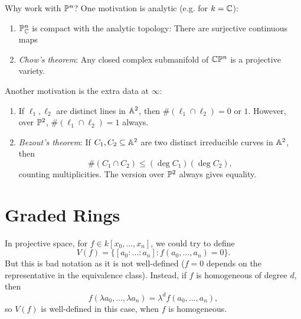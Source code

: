 \begin{remark}
  Why work with $\mathbb{P}^n$? One motivation
  is analytic (e.g. for $k = \mathbb{C}$):
  \begin{enumerate}
    \item $\mathbb{P}^n_{\mathbb{C}}$ is compact
      with the analytic topology:
      There are surjective continuous maps
      \begin{center}
      \end{center}
    \item \emph{Chow's theorem}:
      Any closed complex submanifold
      of $\mathbb{C} \mathbb{P}^n$ is a projective
      variety.
  \end{enumerate}
  Another motivation is the extra data
  at $\infty$:
  \begin{enumerate}
    \item If $\ell_1, \ell_2$ are
      distinct lines in $\mathbb{A}^2$, then
      $\#(\ell_1 \cap \ell_2) = 0$ or $1$.
      However, over $\mathbb{P}^2$,
      $\#(\ell_1 \cap \ell_2) = 1$ always.
    \item \emph{Bezout's theorem}: If
      $C_1, C_2 \subseteq \mathbb{A}^2$ are
      two distinct irreducible curves in
      $\mathbb{A}^2$, then
      \[
        \#(C_1 \cap C_2)
        \le (\deg C_1)(\deg C_2),
      \]
      counting multiplicities. The
      version over $\mathbb{P}^2$ always gives
      equality.
  \end{enumerate}
\end{remark}

\section{Graded Rings}

\begin{remark}
  In projective space,
  for $f \in k[x_0, \dots, x_n]$,
  we could try to define
  \[
    V(f) = \{[a_0 : \dots : a_n] : f(a_0, \dots, a_n) = 0\}.
  \]
  But this is bad notation as it is
  not well-defined ($f = 0$ depends on
  the representative in the equivalence
  class). Instead, if $f$ is homogeneous
  of degree $d$, then
  \[
    f(\lambda a_0, \dots, \lambda a_n)
    = \lambda^d f(a_0, \dots, a_n),
  \]
  so $V(f)$ is well-defined in this case,
  when $f$ is homogeneous.
\end{remark}

